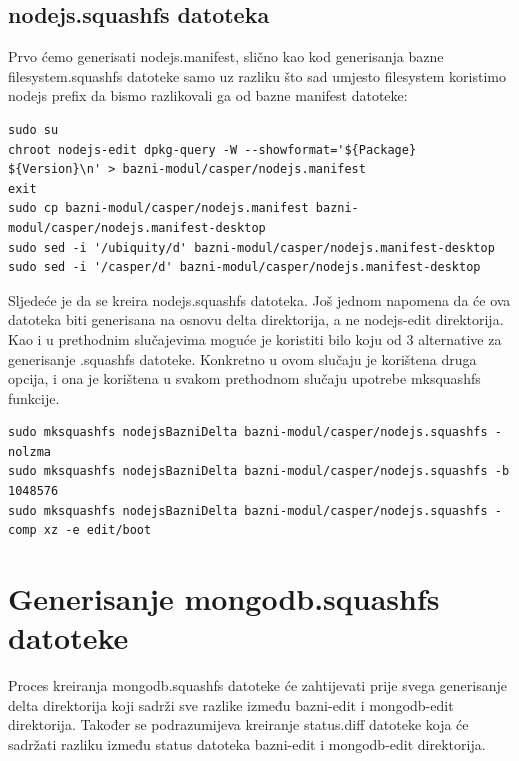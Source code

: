 \documentclass[12pt,vi]{mitthesis}
\begin{document}
\subsection*{nodejs.squashfs datoteka}
\indent
Prvo ćemo generisati nodejs.manifest, slično kao kod generisanja bazne filesystem.squashfs datoteke samo uz razliku što sad umjesto filesystem koristimo nodejs prefix da bismo razlikovali ga od bazne manifest datoteke:
\begin{lstlisting}[style=BashInputStyle]
sudo su
chroot nodejs-edit dpkg-query -W --showformat='${Package} ${Version}\n' > bazni-modul/casper/nodejs.manifest
exit
sudo cp bazni-modul/casper/nodejs.manifest bazni-modul/casper/nodejs.manifest-desktop
sudo sed -i '/ubiquity/d' bazni-modul/casper/nodejs.manifest-desktop
sudo sed -i '/casper/d' bazni-modul/casper/nodejs.manifest-desktop
\end{lstlisting}
\indent
Sljedeće je da se kreira nodejs.squashfs datoteka. Još jednom napomena da će ova datoteka biti generisana na osnovu delta direktorija, a ne nodejs-edit direktorija. Kao i u prethodnim slučajevima moguće je koristiti bilo koju od 3 alternative za generisanje .squashfs datoteke. Konkretno u ovom slučaju je korištena druga opcija, i ona je korištena u svakom prethodnom slučaju upotrebe mksquashfs funkcije.
\begin{lstlisting}[style=BashInputStyle]
sudo mksquashfs nodejsBazniDelta bazni-modul/casper/nodejs.squashfs -nolzma 
sudo mksquashfs nodejsBazniDelta bazni-modul/casper/nodejs.squashfs -b 1048576
sudo mksquashfs nodejsBazniDelta bazni-modul/casper/nodejs.squashfs -comp xz -e edit/boot
\end{lstlisting}

\section*{Generisanje mongodb.squashfs datoteke}
\indent
Proces kreiranja mongodb.squashfs datoteke će zahtijevati prije svega generisanje delta direktorija koji sadrži sve razlike između bazni-edit i mongodb-edit direktorija. Također se podrazumijeva kreiranje status.diff datoteke koja će sadržati razliku između status datoteka bazni-edit i mongodb-edit direktorija.\\
\end{document}
